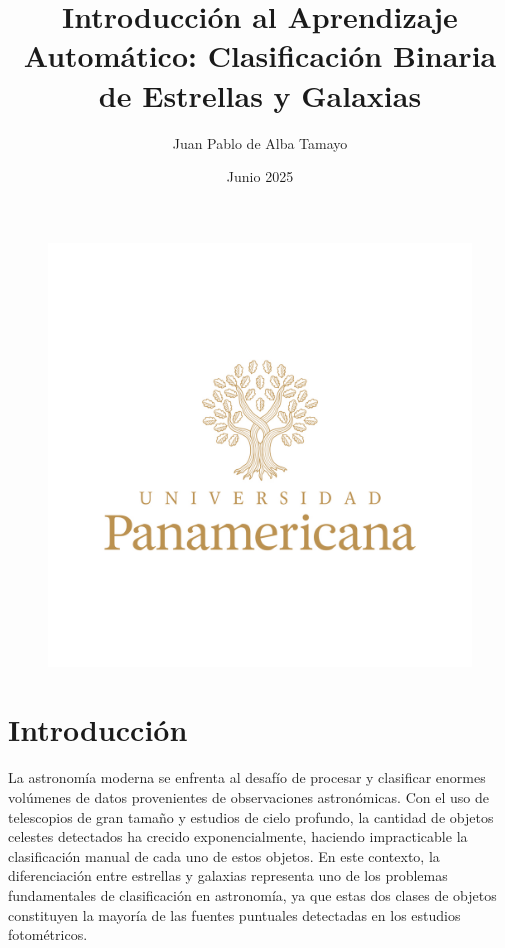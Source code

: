 \documentclass{article}
\title{Introducción al Aprendizaje Automático: Clasificación Binaria de Estrellas y Galaxias}
\author{Juan Pablo de Alba Tamayo}
\date{Junio 2025}
\begin{document}
\begin{figure}[H]
    \centering
    \includegraphics[width=0.75\linewidth]{logo.png}
\end{figure}

\newpage

\maketitle

\newpage

\tableofcontents

\newpage

\listoffigures

\newpage

\listoftables

\newpage

\section{Introducción}

La astronomía moderna se enfrenta al desafío de procesar y clasificar enormes volúmenes de datos provenientes de observaciones astronómicas. Con el uso de telescopios de gran tamaño y estudios de cielo profundo, la cantidad de objetos celestes detectados ha crecido exponencialmente, haciendo impracticable la clasificación manual de cada uno de estos objetos. En este contexto, la diferenciación entre estrellas y galaxias representa uno de los problemas fundamentales de clasificación en astronomía, ya que estas dos clases de objetos constituyen la mayoría de las fuentes puntuales detectadas en los estudios fotométricos.
\end{document}
